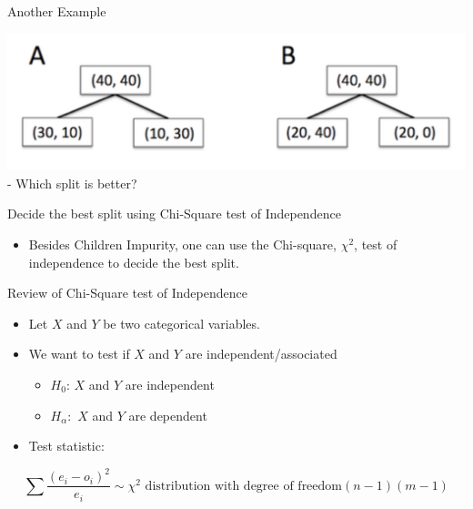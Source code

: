 \documentclass[
  ignorenonframetext,
]{beamer}
\providecommand{\tightlist}{%
  \setlength{\itemsep}{0pt}\setlength{\parskip}{0pt}}
\begin{document}
\begin{frame}{Another Example}
\protect\hypertarget{another-example}{}

\includegraphics{images2/i1.png} - Which split is better?

\end{frame}

\begin{frame}{Decide the best split using Chi-Square test of
Independence}
\protect\hypertarget{decide-the-best-split-using-chi-square-test-of-independence}{}

\begin{itemize}
\tightlist
\item
  Besides Children Impurity, one can use the Chi-square, \(\chi^2\),
  test of independence to decide the best split.
\end{itemize}

\end{frame}

\begin{frame}{Review of Chi-Square test of Independence}
\protect\hypertarget{review-of-chi-square-test-of-independence}{}

\begin{itemize}
\tightlist
\item
  Let \(X\) and \(Y\) be two categorical variables.
\item
  We want to test if \(X\) and \(Y\) are independent/associated

  \begin{itemize}
  \tightlist
  \item
    \(H_0\): \(X\) and \(Y\) are independent
  \item
    \(H_{\alpha}:\) \(X\) and \(Y\) are dependent
  \end{itemize}
\item
  Test statistic:
\end{itemize}

\[\sum\frac{(e_i-o_i)^2}{e_i} \sim \chi^2 \text{ distribution with degree of freedom} (n-1)(m-1)\]

\end{frame}
\end{document}
